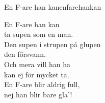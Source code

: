 \begin{song}{En F-are han kan}{enfarehankan}
\begin{vers}
En F-are han kan\\
ta supen som en man.\\
Den supen i strupen på glupen\\
den försvann.\\
Och mera vill han ha\\
kan ej för mycket ta.\\
En F-are blir aldrig full,\\
nej han blir bare gla'! \\
\end{vers}
\end{song}
